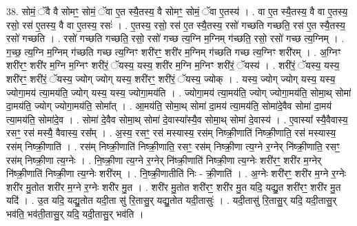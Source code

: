 \documentclass[17pt]{extarticle}
\begin{document}
38. सोमं॒ ॅवै वै सोमꣳ॒॒ सोमं॒ ॅवा ए॒त स्यै॒तस्य॒ वै सोमꣳ॒॒ सोमं॒ ॅवा ए॒तस्य॑ । . वा ए॒त स्यै॒तस्य॒ वै वा ए॒तस्य॒ रसो॒ रस॑ ए॒तस्य॒ वै वा ए॒तस्य॒ रसः॑ । . ए॒तस्य॒ रसो॒ रस॑ ए॒त स्यै॒तस्य॒ रसो॑ गच्छति गच्छति॒ रस॑ ए॒त स्यै॒तस्य॒ रसो॑ गच्छति । . रसो॑ गच्छति गच्छति॒ रसो॒ रसो॑ गच्छ त्य॒ग्नि म॒ग्निम् ग॑च्छति॒ रसो॒ रसो॑ गच्छ त्य॒ग्निम् । . ग॒च्छ॒ त्य॒ग्नि म॒ग्निम् ग॑च्छति गच्छ त्य॒ग्निꣳ शरी॑रꣳ॒॒ शरी॑र म॒ग्निम् ग॑च्छति गच्छ त्य॒ग्निꣳ शरी॑रम् । . अ॒ग्निꣳ शरी॑रꣳ॒॒ शरी॑र म॒ग्नि म॒ग्निꣳ शरी॑रं॒ ॅयस्य॒ यस्य॒ शरी॑र म॒ग्नि म॒ग्निꣳ शरी॑रं॒ ॅयस्य॑ । . शरी॑रं॒ ॅयस्य॒ यस्य॒ शरी॑रꣳ॒॒ शरी॑रं॒ ॅयस्य॒ ज्योग् ज्योग् यस्य॒ शरी॑रꣳ॒॒ शरी॑रं॒ ॅयस्य॒ ज्योक् । . यस्य॒ ज्योग् ज्योग् यस्य॒ यस्य॒ ज्योगा॒मय॑ त्या॒मय॑ति॒ ज्योग् यस्य॒ यस्य॒ ज्योगा॒मय॑ति । . ज्योगा॒मय॑ त्या॒मय॑ति॒ ज्योग् ज्योगा॒मय॑ति॒ सोमा॒थ् सोमा॑ दा॒मय॑ति॒ ज्योग् ज्योगा॒मय॑ति॒ सोमा᳚त् । . आ॒मय॑ति॒ सोमा॒थ् सोमा॑ दा॒मय॑ त्या॒मय॑ति॒ सोमा॑दे॒वैव सोमा॑ दा॒मय॑ त्या॒मय॑ति॒ सोमा॑दे॒व । . सोमा॑ दे॒वैव सोमा॒थ् सोमा॑ दे॒वास्या᳚स्यै॒व सोमा॒थ् सोमा॑ दे॒वास्य॑ । . ए॒वास्या᳚ स्यै॒वैवास्य॒ रसꣳ॒॒ रस॑ मस्यै॒ वैवास्य॒ रस᳚म् । . अ॒स्य॒ रसꣳ॒॒ रस॑ मस्यास्य॒ रस॑म् निष्क्री॒णाति॑ निष्क्री॒णाति॒ रस॑ मस्यास्य॒ रस॑म् निष्क्री॒णाति॑ । . रस॑म् निष्क्री॒णाति॑ निष्क्री॒णाति॒ रसꣳ॒॒ रस॑म् निष्क्री॒णा त्य॒ग्ने र॒ग्नेर् नि॑ष्क्री॒णाति॒ रसꣳ॒॒ रस॑म् निष्क्री॒णा त्य॒ग्नेः । . नि॒ष्क्री॒णा त्य॒ग्ने र॒ग्नेर् नि॑ष्क्री॒णाति॑ निष्क्री॒णा त्य॒ग्नेः शरी॑रꣳ॒॒ शरी॑र म॒ग्नेर् नि॑ष्क्री॒णाति॑ निष्क्री॒णा त्य॒ग्नेः शरी॑रम् । . नि॒ष्क्री॒णातीति॑ निः - क्री॒णाति॑ । . अ॒ग्नेः शरी॑रꣳ॒॒ शरी॑र म॒ग्ने र॒ग्नेः शरी॑र मु॒तोत शरी॑र म॒ग्ने र॒ग्नेः शरी॑र मु॒त । . शरी॑र मु॒तोत शरी॑रꣳ॒॒ शरी॑र मु॒त यदि॒ यद्यु॒त शरी॑रꣳ॒॒ शरी॑र मु॒त यदि॑ । . उ॒त यदि॒ यद्यु॒तोत यदी॒ता सु॑ रि॒तासु॒र् यद्यु॒तोत यदी॒तासुः॑ । . यदी॒तासु॑ रि॒तासु॒र् यदि॒ यदी॒तासु॒र् भव॑ति॒ भव॑ती॒तासु॒र् यदि॒ यदी॒तासु॒र् भव॑ति । \newline
\pagebreak
{}
\end{document}
